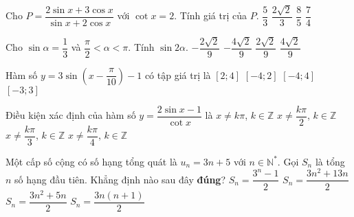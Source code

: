 \begin{ex}%
	Cho $P=\dfrac{2\sin x+3\cos x}{\sin x+2\cos x}$ với $\cot x=2$. Tính giá trị của $P$.
	\choice
	{$\dfrac{5}{3}$}
	{$\dfrac{2\sqrt{2}}{3}$}
	{\True $\dfrac{8}{5}$}
	{$\dfrac{7}{4}$}
\end{ex}

\begin{ex}%
	Cho $\sin\alpha=\dfrac{1}{3}$ và $\dfrac{\pi}{2}<\alpha<\pi$. Tính $\sin 2\alpha$.
	\choice
	{$-\dfrac{2\sqrt{2}}{9}$}
	{\True $-\dfrac{4\sqrt{2}}{9}$}
	{$\dfrac{2\sqrt{2}}{9}$}
	{$\dfrac{4\sqrt{2}}{9}$}
\end{ex}

\begin{ex}%
	Hàm số $y=3\sin\left(x-\dfrac{\pi}{10}\right)-1$ có tập giá trị là
	\choice
	{$[2;4]$}
	{$[-4;2]$}
	{\True $[-4;4]$}
	{$[-3;3]$}
\end{ex}

\begin{ex}%
	Điều kiện xác định của hàm số $y=\dfrac{2\sin x-1}{\cot x}$ là
	\choice
	{$x\neq k\pi$, $k\in \mathbb{Z}$}
	{\True $x\neq \dfrac{k\pi}{2}$, $k\in \mathbb{Z}$}
	{$x\neq \dfrac{k\pi}{3}$, $k\in \mathbb{Z}$}
	{$x\neq \dfrac{k\pi}{4}$, $k\in \mathbb{Z}$}
\end{ex}

\begin{ex}%
	Một cấp số cộng có số hạng tổng quát là $u_n=3n+5$ với $n\in \mathbb{N}^*$. Gọi $S_n$ là tổng $n$ số hạng đầu tiên. Khẳng định nào sau đây \textbf{đúng}?
	\choice
	{$S_n=\dfrac{3^n-1}{2}$}
	{\True $S_n=\dfrac{3n^2+13n}{2}$}
	{$S_n=\dfrac{3n^2+5n}{2}$}
	{$S_n=\dfrac{3n(n+1)}{2}$}
\end{ex}

